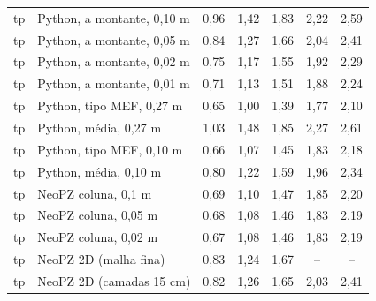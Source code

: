 \begin{tabular}{ll|ccccc}
tp & Python, a montante, 0{,}10 m & 0{,}96 & 1{,}42 & 1{,}83 & 2{,}22 & 2{,}59\\
tp & Python, a montante, 0{,}05 m & 0{,}84 & 1{,}27 & 1{,}66 & 2{,}04 & 2{,}41\\
tp & Python, a montante, 0{,}02 m & 0{,}75 & 1{,}17 & 1{,}55 & 1{,}92 & 2{,}29\\
tp & Python, a montante, 0{,}01 m & 0{,}71 & 1{,}13 & 1{,}51 & 1{,}88 & 2{,}24\\
tp & Python, tipo MEF, 0{,}27 m & 0{,}65 & 1{,}00 & 1{,}39 & 1{,}77 & 2{,}10\\
tp & Python, média, 0{,}27 m & 1{,}03 & 1{,}48 & 1{,}85 & 2{,}27 & 2{,}61\\
tp & Python, tipo MEF, 0{,}10 m & 0{,}66 & 1{,}07 & 1{,}45 & 1{,}83 & 2{,}18\\
tp & Python, média, 0{,}10 m & 0{,}80 & 1{,}22 & 1{,}59 & 1{,}96 & 2{,}34\\
tp & NeoPZ coluna, 0,1 m & 0{,}69 & 1{,}10 & 1{,}47 & 1{,}85 & 2{,}20\\
tp & NeoPZ coluna, 0,05 m & 0{,}68 & 1{,}08 & 1{,}46 & 1{,}83 & 2{,}19\\
tp & NeoPZ coluna, 0,02 m & 0{,}67 & 1{,}08 & 1{,}46 & 1{,}83 & 2{,}19\\
tp & NeoPZ 2D (malha fina) & 0{,}83 & 1{,}24 & 1{,}67 & -- & --\\
tp & NeoPZ 2D (camadas 15 cm) & 0{,}82 & 1{,}26 & 1{,}65 & 2{,}03 & 2{,}41\\
\bottomrule
\end{tabular}
